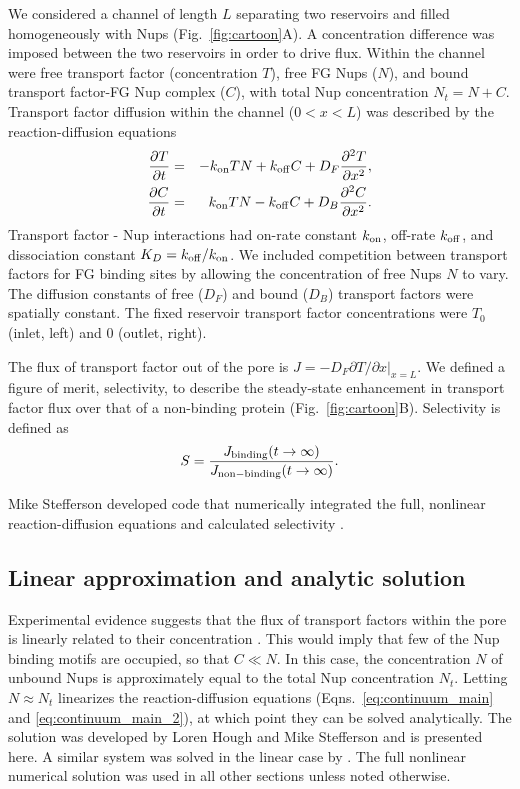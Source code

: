 We considered a channel of length $L$ separating two reservoirs and filled homogeneously with Nups
(Fig.~\ref{fig:cartoon}A).  A concentration difference was imposed between the two reservoirs in order to drive flux.  Within the channel were free transport factor (concentration $T$), free FG Nups ($N$), and bound transport factor-FG Nup complex ($C$), with total Nup concentration $N_t= N+C$.  Transport factor diffusion within the channel ($0<x<L$) was described by the reaction-diffusion equations
\begin{eqnarray}
  \frac{\partial T}{\partial t} &=& -k_{\rm on} T N+k_{\rm off} C +D_F
       \frac{\partial^2 T}{\partial x^2},\label{eq:continuum_main} 
   \\ 
  \frac{\partial C}{\partial t} &=& k_{\rm on} T N -k_{\rm off} C + 
        D_B \frac{\partial^2 C}{\partial x^2} .
\label{eq:continuum_main_2} 
\end{eqnarray}
Transport factor - Nup interactions had on-rate constant $k_{\rm on}$, off-rate $k_{\rm off}$, and
dissociation constant $K_D =k_{\rm off}/k_{\rm on}$.  We included competition
between transport factors for FG binding sites by allowing the concentration of free Nups $N$ to vary\cite{timney16}.  The
diffusion constants of free ($D_F$) and bound ($D_B$) transport factors were
spatially constant. The fixed reservoir transport factor concentrations were $T_0$
(inlet, left) and 0 (outlet, right).

The flux of transport factor out of the pore is
$J = - D_F \left. \partial T/\partial x \right|_{x=L}$.
We defined a figure of merit, selectivity, to describe the steady-state enhancement in transport factor flux over that of a non-binding protein (Fig.~\ref{fig:cartoon}B).  Selectivity is defined as
\begin{equation}
  S =  \frac{J_{\rm binding}(t \to \infty)}{J_{\rm non-binding}(t \to \infty)} .
\end{equation}

Mike Stefferson developed code that numerically integrated the full, nonlinear reaction-diffusion equations and calculated selectivity \cite{stefferson18}.

\subsection{Linear approximation and analytic solution}
\label{sec:linear}
Experimental evidence suggests that the flux of transport factors within the pore is linearly related to their concentration \cite{timney06, schmidt15}.  This would imply that few of the Nup binding motifs are occupied, so that $C \ll N$.  In this case, the concentration $N$ of unbound Nups is approximately equal to the total Nup concentration $N_t$.  Letting $N \approx N_t$ linearizes the reaction-diffusion equations (Eqns.~\ref{eq:continuum_main} and \ref{eq:continuum_main_2}), at which point they can be solved analytically.  The solution was developed by Loren Hough and Mike Stefferson and is presented here.  A similar system was solved in the linear case by \cite{yang18}. The full nonlinear numerical solution was used in all other sections unless noted otherwise.

